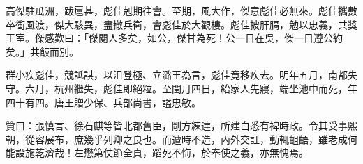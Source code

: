 \begin{pinyinscope}
高傑駐瓜洲，跋扈甚，彪佳剋期往會。至期，風大作，傑意彪佳必無來。彪佳攜數卒衝風渡，傑大駭異，盡撤兵衛，會彪佳於大觀樓。彪佳披肝膈，勉以忠義，共獎王室。傑感歎曰：「傑閱人多矣，如公，傑甘為死！公一日在吳，傑一日遵公約矣。」共飯而別。

群小疾彪佳，競詆諆，以沮登極、立潞王為言，彪佳竟移疾去。明年五月，南都失守。六月，杭州繼失，彪佳即絕粒。至閏月四日，紿家人先寢，端坐池中而死，年四十有四。唐王贈少保、兵部尚書，謚忠敏。

贊曰：張慎言、徐石麒等皆北都舊臣，剛方練達，所建白悉有裨時政。令其受事熙朝，從容展布，庶幾乎列卿之良也。而遭時不造，內外交訌，動輒齟齬，雖老成何能設施乾濟哉！左懋第仗節全貞，蹈死不悔，於奉使之義，亦無愧焉。


\end{pinyinscope}